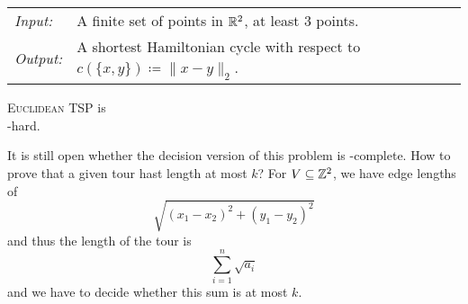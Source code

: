 \documentclass[../skript.tex]{subfiles}
\begin{document}
\begin{problem}
\begin{tabular}{@{}ll}
\textit{Input:} & A finite set of points in $\mathbb{R}^2$, at least 3 points. \\
\textit{Output:} & A shortest Hamiltonian cycle with respect to $c(\{ x, y\}) \coloneqq \| x - y \|_2$.
\end{tabular}
\end{problem}
\begin{theorem} %
\label{thm:92}
\textsc{Euclidean TSP} is \\ \NP-hard.
\end{theorem}
It is still open whether the decision version of this problem is \NP-complete.
How to prove that a given tour hast length at most $k$? For $V \subseteq \mathbb{Z}^2$, we have edge lengths of
\[
	\sqrt{(x_1 - x_2)^2 + (y_1 - y_2)^2}
\]
and thus the length of the tour is
\[
	\sum_{i=1}^n \sqrt{a_i}
\]
and we have to decide whether this sum is at most $k$.
\end{document}
